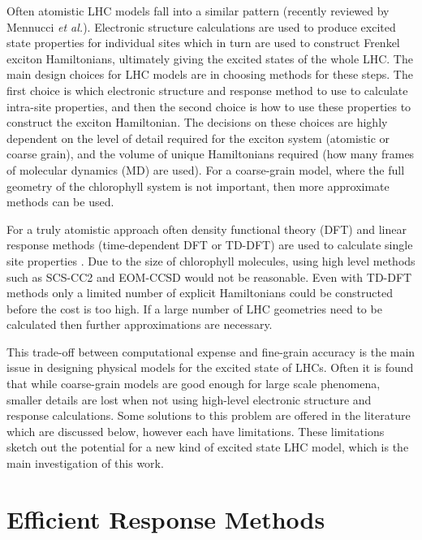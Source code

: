 Often atomistic LHC models fall into a similar pattern (recently reviewed by Mennucci 
\emph{et al.})\cite{Cignoni2022}. Electronic structure calculations are used to
produce excited state properties for individual sites which in turn are used to
construct Frenkel exciton Hamiltonians, ultimately giving the excited states of
the whole LHC. The main design choices for LHC models are in choosing methods for
these steps. The first choice is which electronic structure and response method 
to use to calculate intra-site properties, and then the second choice is how to 
use these properties to construct the exciton Hamiltonian. The decisions on these
choices are highly dependent on the level of detail required for the exciton system
(atomistic or coarse grain), and the volume of unique Hamiltonians required (how 
many frames of molecular dynamics (MD) are used). For a coarse-grain model, where
the full geometry of the chlorophyll system is not important, then more approximate 
methods can be used.

For a truly atomistic approach often density functional theory (DFT) and linear 
response methods (time-dependent DFT or TD-DFT) are used to calculate single site
properties \cite{Cignoni2022}. Due to the size of chlorophyll molecules, using high
level methods such as SCS-CC2 and EOM-CCSD would not be reasonable. Even with TD-DFT
methods only a limited number of explicit Hamiltonians could be constructed before
the cost is too high. If a large number of LHC geometries need to be calculated 
then further approximations are necessary.

This trade-off between computational expense and fine-grain accuracy is the main
issue in designing physical models for the excited state of LHCs. Often it is found
that while coarse-grain models are good enough for large scale phenomena, smaller
details are lost when not using high-level electronic structure and response calculations.
Some solutions to this problem are offered in the literature which are discussed 
below, however each have limitations. These limitations sketch out the potential 
for a new kind of excited state LHC model, which is the main investigation of this
work.

\section{Efficient Response Methods}
\label{sec:efficient_response_methods}


